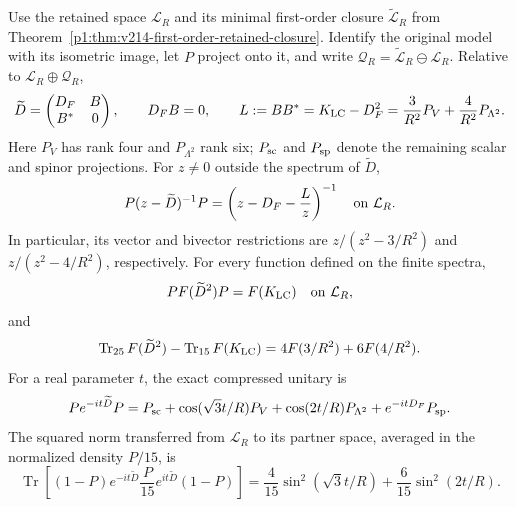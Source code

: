 \documentclass[11pt]{article}
\begin{document}
\begin{theorem}
\label{p1:thm:v215-closure-return}
Use the retained space \(\mathcal L_R\) and its minimal first-order
closure \(\widetilde{\mathcal L}_R\) from
Theorem~\ref{p1:thm:v214-first-order-retained-closure}. Identify the
original model with its isometric image, let \(P\) project onto it,
and write
\(\mathcal Q_R=\widetilde{\mathcal L}_R\ominus\mathcal L_R\).
Relative to \(\mathcal L_R\oplus\mathcal Q_R\),
\[
 \widetilde D=\begin{pmatrix}D_F&B\\ B^*&0\end{pmatrix},\qquad
 D_FB=0,\qquad
 L:=BB^*=K_{\rm LC}-D_F^2
       =\frac3{R^2}P_V+\frac4{R^2}P_{\Lambda^2}.
\]
Here \(P_V\) has rank four and \(P_{\Lambda^2}\) rank six;
\(P_{\rm sc}\) and \(P_{\rm sp}\) denote the remaining scalar and
spinor projections. For \(z\ne0\) outside the spectrum of
\(\widetilde D\),
\[
 P(z-\widetilde D)^{-1}P
       =\left(z-D_F-\frac{L}{z}\right)^{-1}
          \quad\hbox{on }\mathcal L_R.
\]
In particular, its vector and bivector restrictions are
\(z/(z^2-3/R^2)\) and \(z/(z^2-4/R^2)\), respectively.
For every function defined on the finite spectra,
\[
 P F(\widetilde D^2)P=F(K_{\rm LC})
       \quad\hbox{on }\mathcal L_R,
\]
and
\[
 \operatorname{Tr}_{25}F(\widetilde D^2)
 -\operatorname{Tr}_{15}F(K_{\rm LC})
            =4F(3/R^2)+6F(4/R^2).
\]
For a real parameter \(t\), the exact compressed unitary is
\[
 P e^{-it\widetilde D}P
 =P_{\rm sc}+\cos(\sqrt3t/R)P_V
    +\cos(2t/R)P_{\Lambda^2}+e^{-itD_F}P_{\rm sp}.
\]
The squared norm transferred from \(\mathcal L_R\) to its partner
space, averaged in the normalized density \(P/15\), is
\[
 \operatorname{Tr}\left[(1-P)e^{-it\widetilde D}
           \frac{P}{15}e^{it\widetilde D}(1-P)\right]
 =\frac4{15}\sin^2(\sqrt3t/R)+\frac6{15}\sin^2(2t/R).
\]
\end{theorem}
\end{document}
